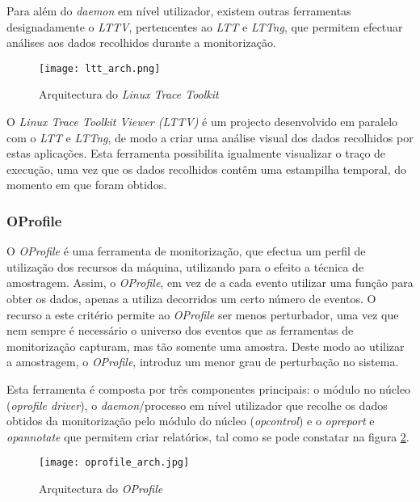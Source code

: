 Para além do \textit{daemon} em nível utilizador, existem outras ferramentas designadamente o \textit{LTTV}, pertencentes ao \textit{LTT} e \textit{LTTng}, que permitem efectuar análises aos dados recolhidos durante a monitorização.

\begin{figure}[!htb]
       \centering
       \texttt{[image: ltt\_arch.png]}
       \caption{Arquitectura do \textit{Linux Trace Toolkit} \cite{Yaghmour:2000:MCS:1267724.1267726}}
	\label{fig:ltt_arch}
\end{figure}

O \textit{Linux Trace Toolkit Viewer (LTTV)} é um projecto desenvolvido em paralelo com o \textit{LTT} e \textit{LTTng}, de modo a criar uma análise visual dos dados recolhidos por estas aplicações.
Esta ferramenta possibilita igualmente visualizar o traço de execução, uma vez que os dados recolhidos contêm uma estampilha temporal, do momento em que foram obtidos.

\subsubsection{OProfile}\label{cap:Oprofile_overview}
O \textit{OProfile} é uma ferramenta de monitorização, que efectua um perfil de utilização dos recursos da máquina, utilizando para o efeito a técnica de amostragem.
Assim, o \textit{OProfile}, em vez de a cada evento utilizar uma função para obter os dados, apenas a utiliza decorridos um certo número de eventos.
O recurso a este critério permite ao \textit{OProfile} ser menos perturbador, uma vez que nem sempre é necessário o universo dos eventos que as ferramentas de monitorização capturam, mas tão somente uma amostra.
Deste modo ao utilizar a amostragem, o \textit{OProfile}, introduz um menor grau de perturbação no sistema\cite{Will:TuninProgrOProf}.

Esta ferramenta é composta por três componentes principais: o módulo no núcleo (\textit{oprofile driver}), o \textit{daemon}/processo em nível utilizador que recolhe os dados obtidos da monitorização pelo módulo do núcleo (\textit{opcontrol}) e o \textit{opreport} e \textit{opannotate} que permitem criar relatórios, tal como se pode constatar na figura \ref{fig:oprofile_arch}.

\begin{figure}[!htb]
       \centering
       \texttt{[image: oprofile\_arch.jpg]}
       \caption{Arquitectura do \textit{OProfile} \cite{Will:TuninProgrOProf}}
	\label{fig:oprofile_arch}
\end{figure}

